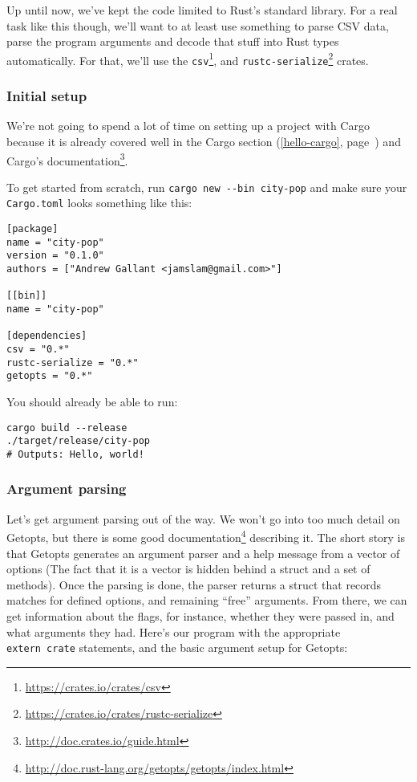 \documentclass[a4paper,]{book}
\renewcommand*{\hypertarget}[3][\ar]{%
  \def\ar{#2}%
  \label{#1}%
  #3}
\renewcommand*{\hyperlink}[2]{%
 #2 (\autoref{#1}, page~\pageref{#1})}
\renewcommand{\href}[2]{#2\footnote{\url{#1}}}
\begin{document}
Up until now, we've kept the code limited to Rust's standard library.
For a real task like this though, we'll want to at least use something
to parse CSV data, parse the program arguments and decode that stuff
into Rust types automatically. For that, we'll use the
\href{https://crates.io/crates/csv}{\texttt{csv}}, and
\href{https://crates.io/crates/rustc-serialize}{\texttt{rustc-serialize}}
crates.

\hypertarget{initial-setup}{\subsubsection{Initial
setup}\label{initial-setup}}

We're not going to spend a lot of time on setting up a project with
Cargo because it is already covered well in
\protect\hyperlink{hello-cargo}{the Cargo section} and
\href{http://doc.crates.io/guide.html}{Cargo's documentation}.

To get started from scratch, run \texttt{cargo\ new\ -\/-bin\ city-pop}
and make sure your \texttt{Cargo.toml} looks something like this:

\begin{verbatim}
[package]
name = "city-pop"
version = "0.1.0"
authors = ["Andrew Gallant <jamslam@gmail.com>"]

[[bin]]
name = "city-pop"

[dependencies]
csv = "0.*"
rustc-serialize = "0.*"
getopts = "0.*"
\end{verbatim}

You should already be able to run:

\begin{verbatim}
cargo build --release
./target/release/city-pop
# Outputs: Hello, world!
\end{verbatim}

\hypertarget{argument-parsing}{\subsubsection{Argument
parsing}\label{argument-parsing}}

Let's get argument parsing out of the way. We won't go into too much
detail on Getopts, but there is
\href{http://doc.rust-lang.org/getopts/getopts/index.html}{some good
documentation} describing it. The short story is that Getopts generates
an argument parser and a help message from a vector of options (The fact
that it is a vector is hidden behind a struct and a set of methods).
Once the parsing is done, the parser returns a struct that records
matches for defined options, and remaining ``free'' arguments. From
there, we can get information about the flags, for instance, whether
they were passed in, and what arguments they had. Here's our program
with the appropriate \texttt{extern\ crate} statements, and the basic
argument setup for Getopts:
\end{document}
